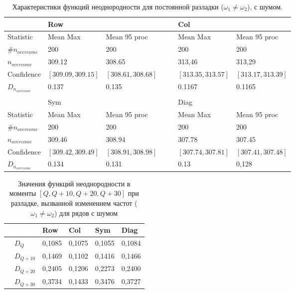 \documentclass[specialist, substylefile = spbu.rtx,
			   subf, href, 12pt]{disser}
\begin{document}
\newpage
\begin{table}[!hhh]
	\center
	\small
	\caption{Характеристики функций неоднородности для постоянной разладки ($\omega_1 \neq \omega_2$), с шумом.}
	\begin{tabular}{l|lll|lll}
		 				   & 	Row   	  & 			 &&   & 	Col 	      & 			      \\
		 				   \hline
		 Statistic        & Mean Max 	  & Mean 95 proc && 	& Mean Max     & Mean 95 proc     \\
		 $\#n_{overcome}$ & 200 	  	  & 200 		 &&     & 200 	      & 200 			  \\
		 $n_{overcome}$   & 309.12   	  & 308.65      &&     & 313,46       & 313,29 		  \\
		 Confidence       & $[309.09, 309.15]$& $[308.61, 308.68]$&&     & $[313.35, 313.57]$ & $[313.17, 313.39]$\\
		$D_{n_{overcome}}$& 0.137		  &	0.135		 &&     & 0.1167			  &   0.1165                \\
		& 		  	  & 			 && & 		      & \\
		  				   & 	Sym	  	  & 			 && & 		 Diag     & 			      \\
		  				   \hline
		 Statistic        & Mean Max 	  & Mean 95 proc && 	& Mean Max     & Mean 95 proc     \\
		 $\#n_{overcome}$ & 200 	  	  & 200 		 &&     & 200 	      & 200 			  \\
		 $n_{overcome}$   & 309.46   	  & 308.94      &&     & 307.78      & 307.45 		  \\
		 Confidence       & $[309.42, 309.49]$ & $[308.91, 308.98]$ &&     & $[307.74, 307.81]$ & $[307.41, 307.48]$     \\
		$D_{n_{overcome}}$& 0.134		  &	0.131		 &&     & 0.13		 &0,128                   \\
	\end{tabular}
	\label{tab:PermanentNoisedHeterogeneity}
\end{table}

\begin{table}[!hhh]
	\center
	\caption{Значения функций неоднородности в моменты $[Q, Q+10, Q+20, Q+30]$ при разладке, вызванной изменением частот ($\omega_1 \neq \omega_2$) для рядов с шумом}
	\begin{tabular}{ll|llll}
		&              & Row 	  & Col 	& Sym    & Diag  \\
		\hline
		& $D_Q$        & 0,1085	  & 0,1075 	& 0,1055 & 0,1084		\\
		& $D_{Q+10}$   & 0,1469   & 0,1102  & 0,1416 & 0,1466	\\
		& $D_{Q+20}$   & 0,2405   & 0,1206  & 0,2273 & 0,2400	\\
		& $D_{Q+30}$   & 0,3734	  &	0,1433	& 0,3476 & 0,3727	
	\end{tabular}
	\label{tab:PermanentNoisedHeterogeneityValues}
\end{table}
\end{document}

